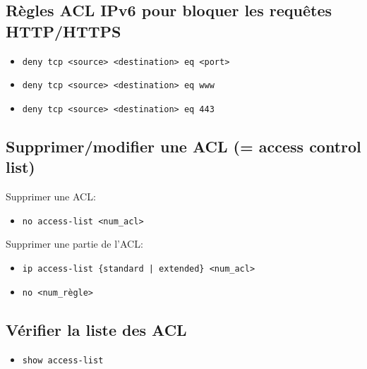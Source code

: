 \documentclass[a4paper]{article}
\begin{document}
\subsection{Règles ACL IPv6 pour bloquer les requêtes HTTP/HTTPS}



\begin{itemize}[label=\textbf{–}]
    \item \texttt{deny tcp <source> <destination> eq <port>}
    \item \texttt{deny tcp <source> <destination> eq www}
    \item \texttt{deny tcp <source> <destination> eq 443}
\end{itemize}





\subsection{Supprimer/modifier une ACL (= access control list)}



Supprimer une ACL:
\begin{itemize}[label=\textbf{–}]
    \item \texttt{no access-list <num\_acl>}
\end{itemize}
Supprimer une partie de l'ACL:
\begin{itemize}[label=\textbf{–}]
    \item \texttt{ip access-list \{standard | extended\} <num\_acl>}
    \item \texttt{no <num\_règle>}
\end{itemize}





\subsection{Vérifier la liste des ACL}



\begin{itemize}[label=\textbf{–}]
    \item \texttt{show access-list}
\end{itemize}
\end{document}
